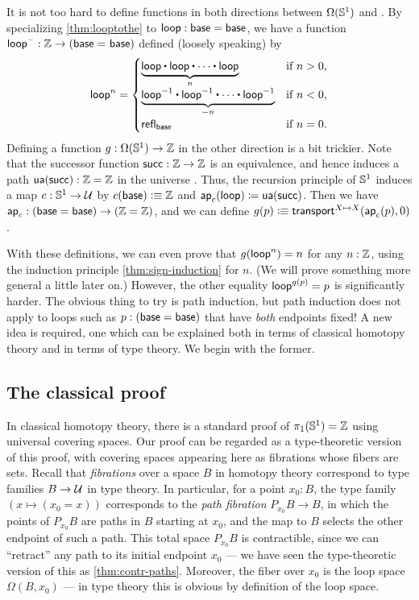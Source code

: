 It is not too hard to define functions in both directions between $\Omega(\mathbb{S}^1)$ and \Z.
By specializing \cref{thm:looptothe} to $\mathsf{loop}:\mathsf{base}=\mathsf{base}$, we have a function $\mathsf{loop}^{\mathord{\hspace{1pt}\text{--}\hspace{1pt}}} : \mathbb{Z} \rightarrow (\mathsf{base} =_{} \mathsf{base})$ defined (loosely speaking) by
\[
  \lloop^n =
  \begin{cases}
    \underbrace{\lloop \ct \lloop \ct \cdots \ct \lloop}_{n}  & \text{if $n > 0$,} \\
    \underbrace{\opp \lloop \ct \opp \lloop \ct \cdots \ct \opp \lloop}_{-n} & \text{if $n < 0$,} \\
    \refl{\base} & \text{if $n = 0$.}
\end{cases}
\]
%
Defining a function $g:\Omega(\mathbb{S}^1)\to\mathbb{Z}$ in the other direction is a bit trickier.
Note that the successor function $\mathsf{succ}:\mathbb{Z}\to\mathbb{Z}$ is an equivalence,
%
and hence induces a path $\mathsf{ua}(\mathsf{succ}):\mathbb{Z}=\mathbb{Z}$ in the universe \type.
Thus, the recursion principle of $\mathbb{S}^1$ induces a map $c:\mathbb{S}^1\to\mathcal{U}$ by $c(\mathsf{base})\vcentcolon\equiv \mathbb{Z}$ and $\mathsf{ap}_{c} (\mathsf{loop}) \coloneqq \mathsf{ua}(\mathsf{succ})$.
Then we have $\mathsf{ap}_{c} : (\mathsf{base}=\mathsf{base}) \to (\mathbb{Z}=\mathbb{Z})$, and we can define $g(p)\vcentcolon\equiv \mathsf{transport}^{X\mapsto X}(\mathsf{ap}_{c}(p),0)$.

With these definitions, we can even prove that $g(\mathsf{loop}^n)=n$ for any $n:\mathbb{Z}$, using the induction principle \cref{thm:sign-induction} for $n$.
(We will prove something more general a little later on.)
However, the other equality $\mathsf{loop}^{g(p)}=p$ is significantly harder.
The obvious thing to try is path induction, but path induction does not apply to loops such as $p:(\mathsf{base}=\mathsf{base})$ that have \emph{both} endpoints fixed!
A new idea is required, one which can be explained both in terms of classical homotopy theory and in terms of type theory.
We begin with the former.


\subsection{The classical proof}
\label{sec:pi1s1-classical-proof}

%
In classical homotopy theory, there is a standard proof of $\pi_1(\mathbb{S}^1)=\mathbb{Z}$ using universal covering spaces.
Our proof can be regarded as a type-theoretic version of this proof, with covering spaces appearing here as fibrations whose fibers are sets.
%
%
Recall that \emph{fibrations} over a space $B$ in homotopy theory correspond to type families $B\to\mathcal{U}$ in type theory.
%
%
In particular, for a point $x_0:B$, the type family $(x\mapsto (x_0=x))$ corresponds to the \emph{path fibration} $P_{x_0} B \to B$, in which the points of $P_{x_0} B$ are paths in $B$ starting at $x_0$, and the map to $B$ selects the other endpoint of such a path.
This total space $P_{x_0} B$ is contractible, since we can ``retract'' any path to its initial endpoint $x_0$ --- we have seen the type-theoretic version of this as \cref{thm:contr-paths}.
Moreover, the fiber over $x_0$ is the loop space $\Omega(B,x_0)$ --- in type theory this is obvious by definition of the loop space.

